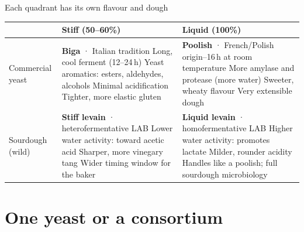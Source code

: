 \documentclass[aspectratio=169,11pt]{beamer}
\begin{document}
\begin{frame}{Each quadrant has its own flavour and dough}
  \footnotesize
  \renewcommand{\arraystretch}{1.0}
  \begin{tabularx}{\textwidth}{@{}>{\bfseries\raggedright}p{1.75cm}LL@{}}
    \toprule
     & \textbf{Stiff (50--60\%)} & \textbf{Liquid (100\%)} \\
    \midrule
    Commercial yeast &
      \textbf{Biga} · Italian tradition\newline
      Long, cool ferment (12--24\,h)\newline
      Yeast aromatics: esters, aldehydes, alcohols\newline
      Minimal acidification\newline
      Tighter, more elastic gluten &
      \textbf{Poolish} · French/Polish origin--16\,h at room temperature\newline
      More amylase and protease (more water)\newline
      Sweeter, wheaty flavour\newline
      Very extensible dough \\
    \midrule
    Sourdough (wild) &
      \textbf{Stiff levain} · heterofermentative LAB\newline
      Lower water activity: toward acetic acid\newline
      Sharper, more vinegary tang\newline
      Wider timing window for the baker &
      \textbf{Liquid levain} · homofermentative LAB\newline
      Higher water activity: promotes lactate\newline
      Milder, rounder acidity\newline
      Handles like a poolish; full sourdough microbiology \\
    \bottomrule
  \end{tabularx}
\end{frame}

\section{One yeast or a consortium}
\end{document}
